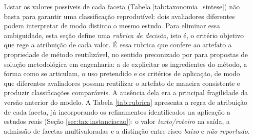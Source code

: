 Listar os valores possíveis de cada faceta (Tabela \ref{tab:taxonomia_sintese}) não basta para garantir uma classificação reprodutível: dois avaliadores diferentes podem interpretar de modo distinto o mesmo estudo. Para eliminar essa ambiguidade, esta seção define uma \textit{rubrica de decisão}, isto é, o critério objetivo que rege a atribuição de cada valor. É essa rubrica que confere ao artefato a propriedade de método reutilizável, no sentido preconizado por \citet{Wieringa2006} para propostas de solução metodológica em engenharia: a de explicitar os ingredientes do método, a forma como se articulam, o uso pretendido e os critérios de aplicação, de modo que diferentes avaliadores possam reutilizar o artefato de maneira consistente e produzir classificações comparáveis. A ausência dela era a principal fragilidade da versão anterior do modelo. A Tabela \ref{tab:rubrica} apresenta a regra de atribuição de cada faceta, já incorporando os refinamentos identificados na aplicação a estudos reais (Seção \ref{sec:tax:instanciacao}): o valor \textit{texto/roteiro} na saída, a admissão de facetas multivaloradas e a distinção entre risco \textit{baixo} e \textit{não reportado}.

